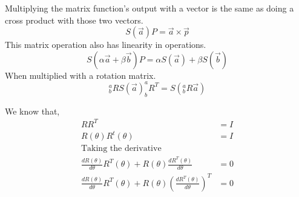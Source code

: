 \documentclass[11pt]{report}
\begin{document}
Multiplying the matrix function's output with a vector is the same as doing a cross product with those two vectors.
$$S (\vec{a}) P = \vec{a} \times \vec{p} $$
This matrix operation also has linearity in operations.
$$S (\alpha\vec{a} + \beta \vec{b}) P = \alpha S(\vec{a}) +  \beta S(\vec{b}) $$
When multiplied with a rotation matrix.
$$^a_bR S(\vec{a})^a_bR^T = S(^a_bR \vec{a})$$

We know that,
\begin{align*}
R R^T &= I \\
R(\theta) R^t(\theta) &= I \\
\text{Taking the derivative} \\
\frac{d R(\theta)}{d \theta} R^T(\theta) + R(\theta) \frac{d R^{T}(\theta)}{d \theta} &= 0 \\
\frac{d R(\theta)}{d \theta} R^T(\theta) + R(\theta) \left( \frac{d R^{T}(\theta)}{d \theta} \right)^{T}&= 0 \\
\end{align*}
\end{document}
